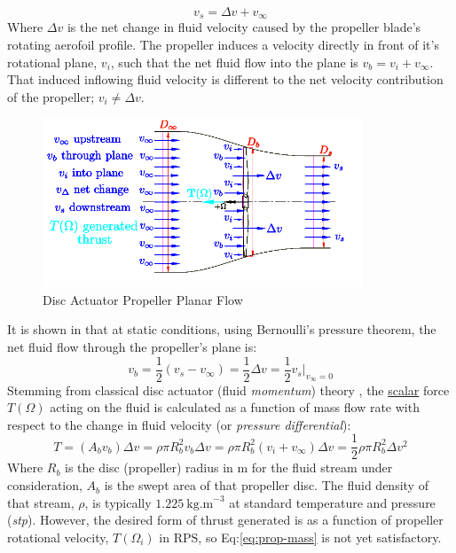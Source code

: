 \begin{equation}
v_s = \Delta v + v_\infty
\end{equation}
Where $\Delta v$ is the net change in fluid velocity caused by the propeller blade's rotating aerofoil profile. The propeller induces a velocity directly in front of it's rotational plane, $v_i$, such that the net fluid flow into the plane is $v_b=v_i+v_\infty$. That induced inflowing fluid velocity is different to the net velocity contribution of the propeller; $v_i\not=\Delta v$.
\par
\begin{figure}[htbp]
\centering
\includegraphics[width=0.85\textwidth]{figs/bem-flow}
\vspace{-8pt}
\caption{Disc Actuator Propeller Planar Flow}
\label{fig:bem-flow}
\vspace{-15pt}
\end{figure}
It is shown in \cite{bladesforquadrotors} that at static conditions, using Bernoulli's pressure theorem, the net fluid flow through the propeller's plane is:
\begin{equation}\label{eq:bernoulli}
v_b = \frac{1}{2} ( v_s - v_{\infty} ) = \frac{1}{2} \Delta v = \frac{1}{2} v_s \big|_{v_\infty=0}
\end{equation}
Stemming from classical disc actuator (fluid \emph{momentum}) theory \cite{fluidmomentum}, the \underline{scalar} force $T(\Omega)$ acting on the fluid is calculated as a function of mass flow rate with respect to the change in fluid velocity (or \emph{pressure differential}):
\begin{equation}\label{eq:prop-mass}
T=(A_b v_b)\Delta v = \rho \pi R_b^2v_b \Delta v = \rho \pi R_b^2(v_i+v_\infty)\Delta v = \frac{1}{2} \rho \pi R_b^2 \Delta v^2
\end{equation}
Where $R_b$ is the disc (propeller) radius in $\text{m}$ for the fluid stream under consideration, $A_b$ is the swept area of that propeller disc. The fluid density of that stream, $\rho$, is typically $1.225~\text{kg.m}^{-3}$ at standard temperature and pressure (\emph{stp}). However, the desired form of thrust generated is as a function of propeller rotational velocity, $T(\Omega_i)$ in $\text{RPS}$, so Eq:\ref{eq:prop-mass} is not yet satisfactory. 
